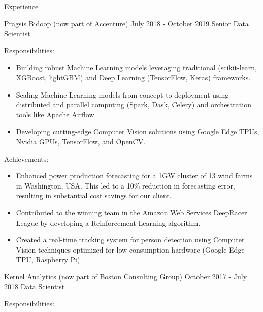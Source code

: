 \documentclass{cv}
\begin{document}
\begin{rSection}{Experience}
\begin{rSubsection}
		\end{rSubsection}
		
		
		\begin{rSubsection}
			{Pragsis Bidoop (now part of Accenture)}
			{July 2018 - October 2019}
			{Senior Data Scientist}
			
			\item Responsibilities:
			\begin{itemize}
				\item Building robust Machine Learning models leveraging traditional (scikit-learn, XGBoost, lightGBM) and Deep Learning (TensorFlow, Keras) frameworks.
				\item Scaling Machine Learning models from concept to deployment using distributed and parallel computing (Spark, Dask, Celery) and orchestration tools like Apache Airflow.
				\item Developing cutting-edge Computer Vision solutions using Google Edge TPUs, Nvidia GPUs, TensorFlow, and OpenCV.
			\end{itemize}
			
			\vspace{2mm}
			
			\item Achievements:
			\begin{itemize}
				\item Enhanced power production forecasting for a 1GW cluster of 13 wind farms in Washington, USA. This led to a 10\% reduction in forecasting error, resulting in substantial cost savings for our client.
				\item Contributed to the winning team in the Amazon Web Services DeepRacer League by developing a Reinforcement Learning algorithm.
				\item Created a real-time tracking system for person detection using Computer Vision techniques optimized for low-consumption hardware (Google Edge TPU, Raspberry Pi).
			\end{itemize}
			
		\end{rSubsection}
		
		
		\begin{rSubsection}
			{Kernel Analytics (now part of Boston Consulting Group)}
			{October 2017 - July 2018}
			{Data Scientist}
			
			\item Responsibilities:
			\begin{itemize}
			

\end{itemize}
\end{rSubsection}
\end{rSection}
\end{document}
